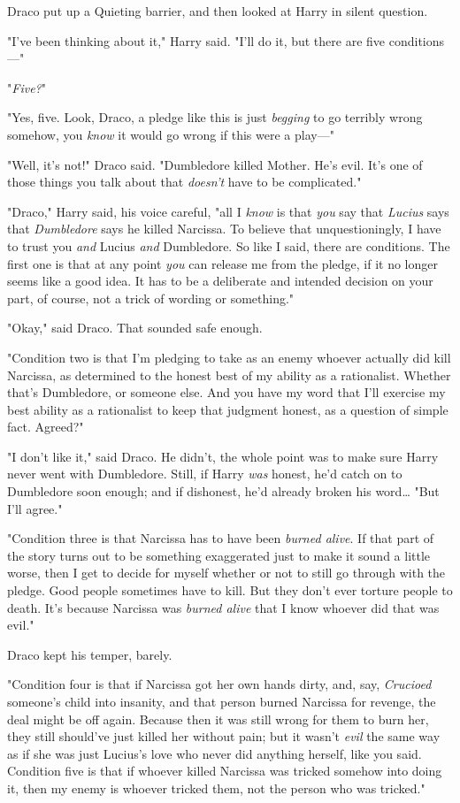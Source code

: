 Draco put up a Quieting barrier, and then looked at Harry in silent question.

"I've been thinking about it," Harry said. "I'll do it, but there are five 
conditions---"

"\emph{Five?}"

"Yes, five. Look, Draco, a pledge like this is just \emph{begging} to go 
terribly wrong somehow, you \emph{know} it would go wrong if this were a 
play---"

"Well, it's not!" Draco said. "Dumbledore killed Mother. He's evil. It's one of 
those things you talk about that \emph{doesn't} have to be complicated."

"Draco," Harry said, his voice careful, "all I \emph{know} is that \emph{you} 
say that \emph{Lucius} says that \emph{Dumbledore} says he killed Narcissa. To 
believe that unquestioningly, I have to trust you \emph{and} Lucius \emph{and} 
Dumbledore. So like I said, there are conditions. The first one is that at any 
point \emph{you} can release me from the pledge, if it no longer seems like a 
good idea. It has to be a deliberate and intended decision on your part, of 
course, not a trick of wording or something."

"Okay," said Draco. That sounded safe enough.

"Condition two is that I'm pledging to take as an enemy whoever actually did 
kill Narcissa, as determined to the honest best of my ability as a rationalist. 
Whether that's Dumbledore, or someone else. And you have my word that I'll 
exercise my best ability as a rationalist to keep that judgment honest, as a 
question of simple fact. Agreed?"

"I don't like it," said Draco. He didn't, the whole point was to make sure 
Harry never went with Dumbledore. Still, if Harry \emph{was} honest, he'd catch 
on to Dumbledore soon enough; and if dishonest, he'd already broken his 
word{\ldots} "But I'll agree."

"Condition three is that Narcissa has to have been \emph{burned alive}. If that 
part of the story turns out to be something exaggerated just to make it sound a 
little worse, then I get to decide for myself whether or not to still go 
through with the pledge. Good people sometimes have to kill. But they don't 
ever torture people to death. It's because Narcissa was \emph{burned alive} 
that I know whoever did that was evil."

Draco kept his temper, barely.

"Condition four is that if Narcissa got her own hands dirty, and, say, 
\emph{Crucioed} someone's child into insanity, and that person burned Narcissa 
for revenge, the deal might be off again. Because then it was still wrong for 
them to burn her, they still should've just killed her without pain; but it 
wasn't \emph{evil} the same way as if she was just Lucius's love who never did 
anything herself, like you said. Condition five is that if whoever killed 
Narcissa was tricked somehow into doing it, then my enemy is whoever tricked 
them, not the person who was tricked."

